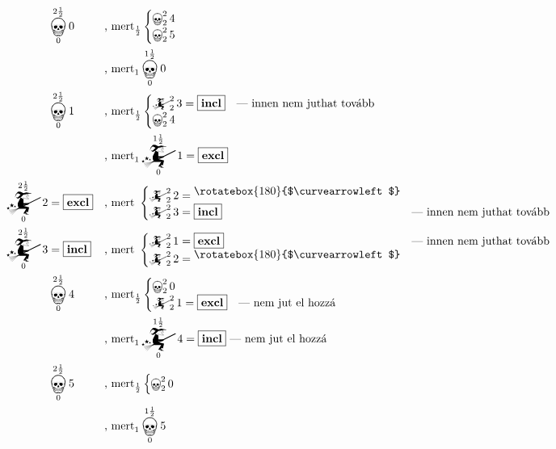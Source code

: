 \documentclass{article}
\newcommand{\nothing}{\text{\raisebox{0.4em}{\rotatebox{180}{$\curvearrowleft$}}}}%
\newcommand{\just}[1]{\boxed{#1}}%
\newcommand{\incl}{\mathbf{incl}}
\newcommand{\excl}{\mathbf{excl}}
\newcommand{\mainfun}[3]{\mathwitch_{#1}^{#2}#3}
\newcommand{\nomainfun}[3]{\bigskull_{#1}^{#2}#3}
\begin{document}
	\begin{align*}
		&\nomainfun0{2\frac12}0               &&\text{, mert}_\frac12\begin{cases}\nomainfun224\\\nomainfun225\end{cases}\\
		&                                     &&\text{, mert}_1\nomainfun0{1\frac12}0\\
		&\nomainfun0{2\frac12}1               &&\text{, mert}_\frac12\begin{cases}\mainfun223 = \just\incl&\text{--- innen nem juthat tovább}\\\nomainfun224\end{cases}\\
		&                                     &&\text{, mert}_1\mainfun0{1\frac12}1 = \just\excl\\
		\mainfun0{2\frac12}2   &= \just\excl  &&\text{, mert }\begin{cases}\mainfun222 = \nothing\\\mainfun223 = \just\incl&\text{--- innen nem juthat tovább}\end{cases}\\
		\mainfun0{2\frac12}3   &= \just\incl  &&\text{, mert }\begin{cases}\mainfun221 = \just\excl&\text{--- innen nem juthat tovább}\\\mainfun222 = \nothing&\end{cases}\\
		&\nomainfun0{2\frac12}4               &&\text{, mert}_\frac12\begin{cases}\nomainfun220\\\mainfun221 = \just\excl&\text{--- nem jut el hozzá}\end{cases}\\
		&                                     &&\text{, mert}_1\mainfun0{1\frac12}4=\just\incl\text{ --- nem jut el hozzá}\\
		&\nomainfun0{2\frac12}5               &&\text{, mert}_\frac12\begin{cases}\nomainfun220\end{cases}\\
		&                                     &&\text{, mert}_1\nomainfun0{1\frac12}5
	\end{align*}
\end{document}
